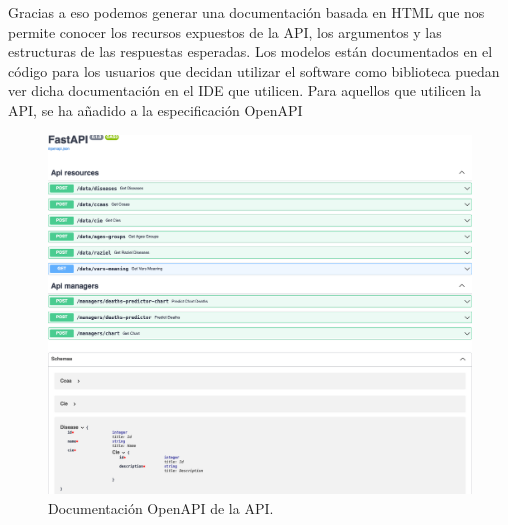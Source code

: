 Gracias a eso podemos generar una documentación basada en HTML que nos permite conocer los recursos expuestos de la API, los argumentos y las estructuras de las respuestas esperadas. Los modelos están documentados en el código para los usuarios que decidan utilizar el software como biblioteca puedan ver dicha documentación en el IDE que utilicen. Para aquellos que utilicen la API, se ha añadido a la especificación OpenAPI

\begin{figure}[]
	\centering	
	\includegraphics[scale=0.5]{doc/logos/imgs/openapi.png}
	\caption{ \cite{rtve-cis} Documentación OpenAPI de la API. }
    \label{fig:worst_f_value}
\end{figure}